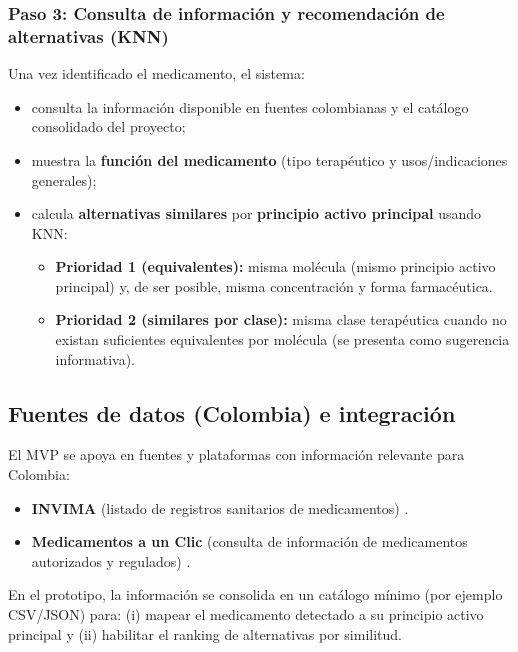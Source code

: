 \subsubsection{Paso 3: Consulta de información y recomendación de alternativas (KNN)}
Una vez identificado el medicamento, el sistema:
\begin{itemize}
	\item consulta la información disponible en fuentes colombianas y el catálogo consolidado del proyecto;
	\item muestra la \textbf{función del medicamento} (tipo terapéutico y usos/indicaciones generales);
	\item calcula \textbf{alternativas similares} por \textbf{principio activo principal} usando KNN:
	\begin{itemize}
		\item \textbf{Prioridad 1 (equivalentes):} misma molécula (mismo principio activo principal) y, de ser posible, misma concentración y forma farmacéutica.
		\item \textbf{Prioridad 2 (similares por clase):} misma clase terapéutica cuando no existan suficientes equivalentes por molécula (se presenta como sugerencia informativa).
	\end{itemize}
\end{itemize}

\subsection{Fuentes de datos (Colombia) e integración}

El MVP se apoya en fuentes y plataformas con información relevante para Colombia:
\begin{itemize}
	\item \textbf{INVIMA} (listado de registros sanitarios de medicamentos) \cite{invima_registros}.
	\item \textbf{Medicamentos a un Clic} (consulta de información de medicamentos autorizados y regulados) \cite{medicamentosaunclic}.
\end{itemize}

En el prototipo, la información se consolida en un catálogo mínimo (por ejemplo CSV/JSON) para: (i) mapear el medicamento detectado a su principio activo principal y (ii) habilitar el ranking de alternativas por similitud.

\pagebreak